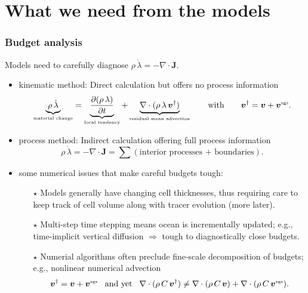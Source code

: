 \documentclass[10pt]{beamer}
\begin{document}
\section{What we need from the models}

\begin{frame}
  \frametitle{Budget analysis}

\begin{center}
\color{red}
Models need to carefully diagnose $\rho \, \dot{\lambda} = -\nabla \cdot {\bm J}.$ 
\color{black}
\end{center}


\begin{itemize}

\item {\sc kinematic method}: Direct calculation but offers no process information 
\begin{equation}
  \underbrace{ \rho \, \dot{\lambda} }_{\mbox{\tiny material change}}
    = \underbrace{ \frac{\partial (\rho \, \lambda)}{\partial t}}_{\mbox{\tiny local tendency}}
    + \underbrace{  \nabla \cdot (\rho \, \lambda \, {\bm v}^{\dagger} ) }_{\mbox{\tiny residual mean advection}}
 \qquad  \mbox{with}  \qquad {\bm v}^{\dagger} = {\bm v} + {\bm v}^{\mbox{\tiny sgs}}. 
\end{equation}


\item {\sc process method}: Indirect calculation offering full process information
\begin{equation}
  \rho \, \dot{\lambda} = -\nabla \cdot {\bm J} = \sum (\mbox{interior processes + boundaries}).
\end{equation}

\item {\sc some numerical issues that make careful budgets tough}: 
\begin{itemize}
\footnotesize 

\item[$\star$] Models generally have changing cell thicknesses, thus
  requiring care to keep track of cell volume along with tracer
  evolution (more later).

\item[$\star$] Multi-step time stepping means ocean is incrementally
  updated; e.g., time-implicit vertical diffusion $\Longrightarrow$
  tough to diagnostically close budgets.

\item[$\star$] Numerial algorithms often preclude fine-scale
  decomposition of budgets; e.g., nonlinear numerical advection
\begin{equation}
   {\bm v}^{\dagger} = {\bm v} + {\bm v}^{\mbox{\tiny sgs}}   \; \; \;  \mbox{and yet} \; \; \; 
  \nabla \cdot ( \rho \, C \, {\bm v}^{\dagger}) \ne \nabla \cdot ( \rho \, C \, {\bm v}) + \nabla \cdot ( \rho \, C \, {\bm v}^{\mbox{\tiny sgs}}  ). 
\end{equation}
 

\end{itemize}

\end{itemize}


\end{frame}
\end{document}
